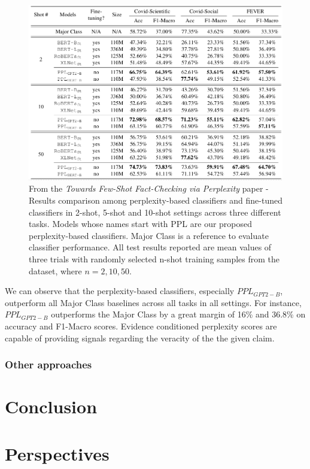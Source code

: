 \documentclass[10pt, english]{report}
\begin{document}
\begin{figure}[H]
	\centering
	\includegraphics[scale=0.43]{img/few_shots_perplexity_evaluation.png}
	\caption{From the \textit{Towards Few-Shot Fact-Checking via Perplexity} paper - Results comparison among perplexity-based classifiers and fine-tuned classifiers in 2-shot, 5-shot and 10-shot settings across three different tasks. Models whose names start with PPL are our proposed perplexity-based classifiers. Major Class is a reference to evaluate classifier performance. All test results reported are mean values of three trials with randomly selected n-shot training samples from the dataset, where $n={2, 10, 50}$.}
\end{figure}

We can observe that the perplexity-based classifiers, especially $PPL_{GPT2-B}$, outperform all Major Class baselines across all
tasks in all settings. For instance, $PPL_{GPT2-B}$ outperforms the Major Class by a great margin of
16\% and 36.8\% on accuracy and F1-Macro scores. Evidence conditioned perplexity scores are capable of providing signals regarding the veracity of the the given claim.

\subsection{Other approaches}




\chapter{Conclusion}


\chapter{Perspectives}




\end{document}
